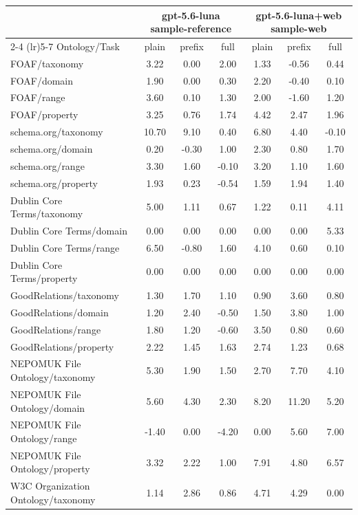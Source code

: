 \begin{tabular}{lcccccc}
\toprule
 & \multicolumn{3}{c}{gpt-5.6-luna sample-reference} & \multicolumn{3}{c}{gpt-5.6-luna+web sample-web} \\
\cmidrule(lr){2-4} \cmidrule(lr){5-7}
Ontology/Task & plain & prefix & full & plain & prefix & full \\
\midrule
FOAF/taxonomy & 3.22 & 0.00 & 2.00 & 1.33 & -0.56 & 0.44 \\
FOAF/domain & 1.90 & 0.00 & 0.30 & 2.20 & -0.40 & 0.10 \\
FOAF/range & 3.60 & 0.10 & 1.30 & 2.00 & -1.60 & 1.20 \\
FOAF/property & 3.25 & 0.76 & 1.74 & 4.42 & 2.47 & 1.96 \\
schema.org/taxonomy & 10.70 & 9.10 & 0.40 & 6.80 & 4.40 & -0.10 \\
schema.org/domain & 0.20 & -0.30 & 1.00 & 2.30 & 0.80 & 1.70 \\
schema.org/range & 3.30 & 1.60 & -0.10 & 3.20 & 1.10 & 1.60 \\
schema.org/property & 1.93 & 0.23 & -0.54 & 1.59 & 1.94 & 1.40 \\
Dublin Core Terms/taxonomy & 5.00 & 1.11 & 0.67 & 1.22 & 0.11 & 4.11 \\
Dublin Core Terms/domain & 0.00 & 0.00 & 0.00 & 0.00 & 0.00 & 5.33 \\
Dublin Core Terms/range & 6.50 & -0.80 & 1.60 & 4.10 & 0.60 & 0.10 \\
Dublin Core Terms/property & 0.00 & 0.00 & 0.00 & 0.00 & 0.00 & 0.00 \\
GoodRelations/taxonomy & 1.30 & 1.70 & 1.10 & 0.90 & 3.60 & 0.80 \\
GoodRelations/domain & 1.20 & 2.40 & -0.50 & 1.50 & 3.80 & 1.00 \\
GoodRelations/range & 1.80 & 1.20 & -0.60 & 3.50 & 0.80 & 0.60 \\
GoodRelations/property & 2.22 & 1.45 & 1.63 & 2.74 & 1.23 & 0.68 \\
NEPOMUK File Ontology/taxonomy & 5.30 & 1.90 & 1.50 & 2.70 & 7.70 & 4.10 \\
NEPOMUK File Ontology/domain & 5.60 & 4.30 & 2.30 & 8.20 & 11.20 & 5.20 \\
NEPOMUK File Ontology/range & -1.40 & 0.00 & -4.20 & 0.00 & 5.60 & 7.00 \\
NEPOMUK File Ontology/property & 3.32 & 2.22 & 1.00 & 7.91 & 4.80 & 6.57 \\
W3C Organization Ontology/taxonomy & 1.14 & 2.86 & 0.86 & 4.71 & 4.29 & 0.00 \\

\end{tabular}
